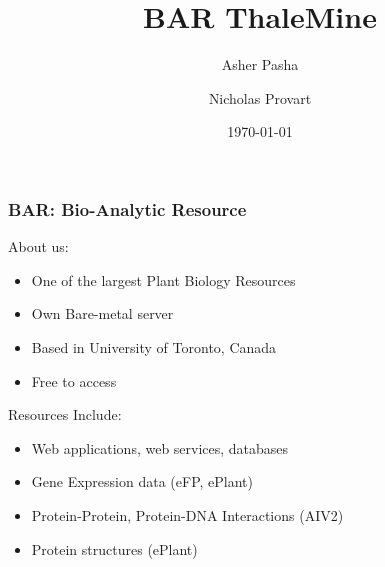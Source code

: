 \documentclass{beamer}
\begin{document}
\title[BAR ThaleMine] 
{BAR ThaleMine}
\author[Pasha, Provart]
{Asher Pasha \and Nicholas Provart}
\date{\today}

\frame{\titlepage}

\begin{frame}
    \frametitle{BAR: Bio-Analytic Resource}
    About us:
    \begin{itemize}
        \item One of the largest Plant Biology Resources
        \item Own Bare-metal server
        \item Based in University of Toronto, Canada
        \item Free to access
    \end{itemize}
    Resources Include:
    \begin{itemize}
        \item Web applications, web services, databases
        \item Gene Expression data (eFP, ePlant)
        \item Protein-Protein, Protein-DNA Interactions (AIV2)
        \item Protein structures (ePlant)
    \end{itemize}
\end{frame}
\end{document}

